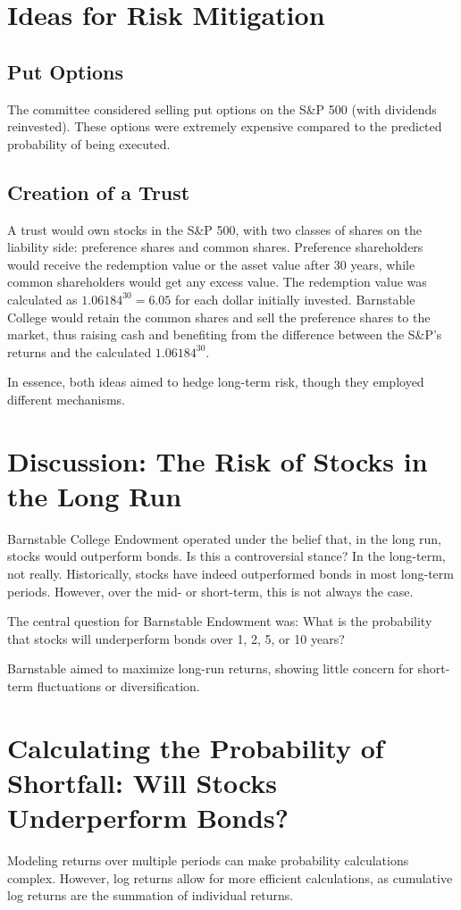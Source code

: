 \documentclass{article}
\begin{document}
\section{Ideas for Risk Mitigation}
\subsection{Put Options}
The committee considered selling put options on the S\&P 500 (with dividends reinvested). These options were extremely expensive compared to the predicted probability of being executed.

\subsection{Creation of a Trust}
A trust would own stocks in the S\&P 500, with two classes of shares on the liability side: preference shares and common shares. Preference shareholders would receive the redemption value or the asset value after 30 years, while common shareholders would get any excess value. The redemption value was calculated as $1.06184^{30} = 6.05$ for each dollar initially invested. Barnstable College would retain the common shares and sell the preference shares to the market, thus raising cash and benefiting from the difference between the S\&P's returns and the calculated $1.06184^{30}$.

In essence, both ideas aimed to hedge long-term risk, though they employed different mechanisms.

\section{Discussion: The Risk of Stocks in the Long Run}

Barnstable College Endowment operated under the belief that, in the long run, stocks would outperform bonds. Is this a controversial stance? In the long-term, not really. Historically, stocks have indeed outperformed bonds in most long-term periods. However, over the mid- or short-term, this is not always the case.

The central question for Barnstable Endowment was: What is the probability that stocks will underperform bonds over 1, 2, 5, or 10 years?

Barnstable aimed to maximize long-run returns, showing little concern for short-term fluctuations or diversification.

\section{Calculating the Probability of Shortfall: Will Stocks Underperform Bonds?}
Modeling returns over multiple periods can make probability calculations complex. However, log returns allow for more efficient calculations, as cumulative log returns are the summation of individual returns.
\end{document}
